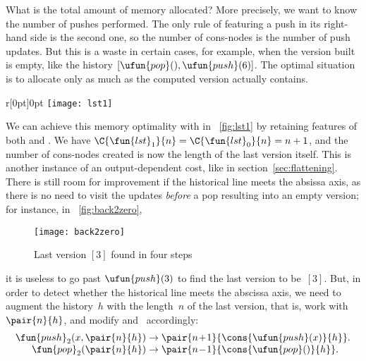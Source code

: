 What is the total amount of memory
allocated? More precisely,
we want to know the number of pushes performed. The only rule of
 featuring a push in its right\hyp{}hand side is the
second one, so the number of cons\hyp{}nodes is the number of push
updates. But this is a waste in certain cases, for example, when the
version built is empty, like the history
\([\ufun{pop}(),\ufun{push}(6)]\). The optimal situation is to
allocate only as much as the computed version actually contains.

%
\setlength{\intextsep}{0pt}
\begin{wrapfigure}[]{r}[0pt]{0pt}
\centering
\texttt{[image: lst1]}
\caption{Last version}
\label{fig:lst1}
\end{wrapfigure}
\hspace*{-5.6pt} We can achieve this memory optimality with
 in \fig~\ref{fig:lst1} by retaining features of both
 and .
We have \(\C{\fun{lst}_1}{n} =
\C{\fun{lst}_0}{n} = n + 1\), and the number of
cons\hyp{}nodes created is now the length of the last
version itself. This is another instance of an output\hyp{}dependent
cost, like
 in
section~\vref{sec:flattening}. There is still room for improvement if
the historical line meets the absissa axis, as there is no need to
visit the updates \emph{before} a pop resulting into an empty version;
for instance, in \fig~\vref{fig:back2zero},
\begin{figure}
\centering
\texttt{[image: back2zero]}
\caption{Last version $[3]$ found in four steps}
\label{fig:back2zero}
\end{figure}
it is useless to go past \(\ufun{push}(3)\)
to find the last version to be~\([3]\). But, in order to detect
whether the historical line meets the abscissa axis, we need to
augment the history~\(h\) with the length~\(n\) of the last version,
that is, work with \(\pair{n}{h}\), and modify
and~ accordingly:
\begin{equation*}
\begin{array}{@{}r@{\;}l@{\;}l@{}}
\fun{push}_2(x,\pair{n}{h}) & \rightarrow &
\pair{n\!+\!1}{\cons{\ufun{push}(x)}{h}}.\\
\fun{pop}_2(\pair{n}{h}) & \rightarrow &
\pair{n\!-\!1}{\cons{\ufun{pop}()}{h}}.
\end{array}
\end{equation*}
